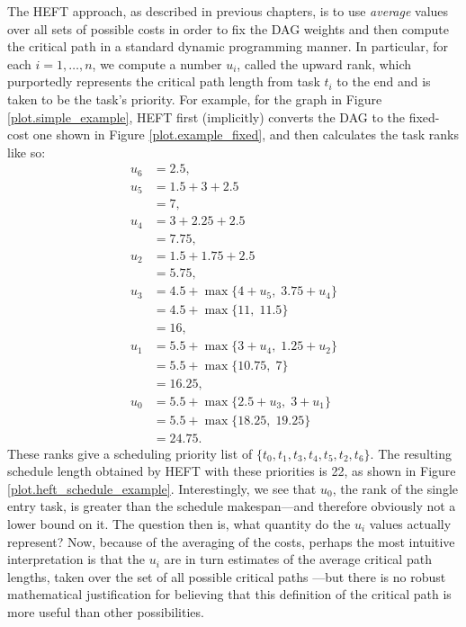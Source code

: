 \documentclass[12pt]{article}
\begin{document}
The HEFT approach, as described in previous chapters, is to use {\em average} values over all sets of possible costs in order to fix the DAG weights and then compute the critical path in a standard dynamic programming manner. In particular, for each $i = 1, \dots, n$, we compute a number $u_i$, called the upward rank, which purportedly represents the critical path length from task $t_i$ to the end and is taken to be the task's priority. For example, for the graph in Figure \ref{plot.simple_example}, HEFT first (implicitly) converts the DAG to the fixed-cost one shown in Figure \ref{plot.example_fixed}, and then calculates the task ranks like so: 
\begin{align*}
u_6 &= 2.5, \\
u_5 &= 1.5 + 3 + 2.5 \\
&= 7, \\
u_4 &= 3 + 2.25 + 2.5 \\
&= 7.75, \\
u_2 &= 1.5 + 1.75 + 2.5\\
&= 5.75, \\
u_3 &= 4.5 + \max\{ 4 + u_5, \; 3.75 + u_4 \} \\
&= 4.5 + \max\{ 11, \; 11.5 \}\\
&= 16, \\
u_1 &= 5.5 + \max\{ 3 + u_4, \; 1.25 + u_2 \} \\
&= 5.5 + \max\{ 10.75, \; 7 \}\\
&= 16.25, \\
u_0 &= 5.5 + \max\{ 2.5 + u_3, \; 3 + u_1 \} \\
&= 5.5 + \max\{ 18.25, \; 19.25 \} \\
&= 24.75.
\end{align*}
These ranks give a scheduling priority list of $\{t_0, t_1, t_3, t_4, t_5, t_2, t_6\}$. The resulting schedule length obtained by HEFT with these priorities is 22, as shown in Figure \ref{plot.heft_schedule_example}. Interestingly, we see that $u_0$, the rank of the single entry task, is greater than the schedule makespan---and therefore obviously not a lower bound on it. The question then is, what quantity do the $u_i$ values actually represent? Now, because of the averaging of the costs, perhaps the most intuitive interpretation is that the $u_i$ are in turn estimates of the average critical path lengths, taken over the set of all possible critical paths ---but there is no robust mathematical justification for believing that this definition of the critical path is more useful than other possibilities.
\end{document}
